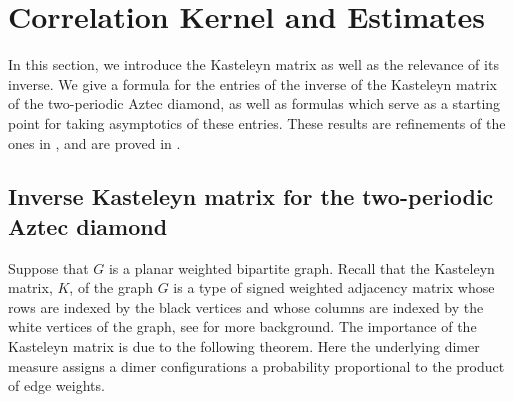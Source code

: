 \documentclass[11pt,twoside]{amsart}
\theoremstyle{plain}
\numberwithin{quest}{section}
\theoremstyle{remark}
\numberwithin{rem}{section}
\theoremstyle{definition}
\begin{document}
	
	
	
	\section{Correlation Kernel and Estimates}
	\label{subsec:KasteleynTheory}
	
	
	In this section, we introduce the Kasteleyn matrix as well as the relevance of its inverse.  We give a formula for the entries of the inverse of the Kasteleyn matrix of the two-periodic Aztec diamond, as well as formulas  which serve as a starting point for taking asymptotics of these entries. These results are refinements of the ones in \cite{CJ16}, and are proved in . 
	
	\subsection{Inverse Kasteleyn matrix for the two-periodic Aztec diamond} 
	Suppose that $G$ is a planar weighted bipartite graph.  Recall that the Kasteleyn matrix, $K$, of the graph $G$ is a type of signed weighted adjacency matrix whose rows are indexed by the black vertices and whose columns are indexed by the white vertices of the graph, see \cite[Section 3]{Joh17} for more background. The importance of the Kasteleyn matrix is due to the following theorem. Here the underlying dimer measure assigns a dimer configurations a probability proportional to the product of edge weights.
	
\end{document}
